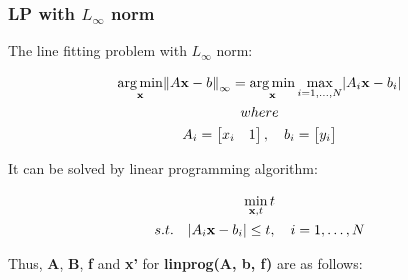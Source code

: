 \documentclass[paper=a4, fontsize=11pt]{scrartcl} %
\numberwithin{equation}{section} %
\numberwithin{figure}{section} %
\numberwithin{table}{section} %
\newcommand{\funcname}[1]{\textbf{#1}}
\renewcommand{\vec}[1]{\mathbf{#1}}
\DeclareMathOperator*{\argmin}{arg\,min} %
\begin{document}
\subsubsection{LP with $L_{\infty}$ norm}

The line fitting problem with $L_{\infty}$ norm: 

\begin{gather*}
\argmin_{\vec{x}} \norm{A\vec{x} - b}_{\infty}  = 
\argmin_{\vec{x}} \max_{i = 1, \dots, N} \abs{A_{i}\vec{x} - b_{i}} \\
where \\
A_{i} = 
\begin{bmatrix}
    x_{i}	&	1 
\end{bmatrix},
\quad b_{i} = 
\begin{bmatrix}
    y_{i}	
\end{bmatrix}
\end{gather*}

It can be solved by linear programming algorithm:

\begin{gather*}
\min_{\vec{x}, t} t \\
 s.t. \quad \abs{A_{i}\vec{x} - b_{i}} \leq t, \quad i = 1, \dots, N
\end{gather*}

Thus, \textbf{A}, \textbf{B}, \textbf{f} and \textbf{x'} for \funcname{linprog(A, b, f)} are as follows:
\end{document}
